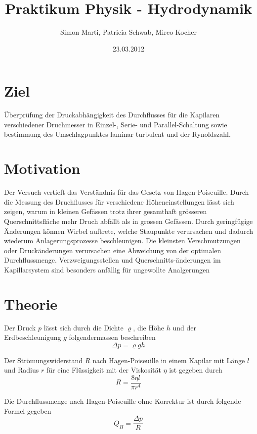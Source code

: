 \documentclass[12pt,a4paper]{article}
\title{Praktikum Physik - Hydrodynamik}
\author{Simon Marti, Patricia Schwab, Mirco Kocher}
\date{23.03.2012}
\begin{document}
\maketitle


\section*{Ziel}
\"Uberpr\"ufung der Druckabh\"angigkeit des Durchflusses f\"ur die Kapilaren verschiedener Druchmesser in Einzel-, Serie- und Parallel-Schaltung sowie bestimmung des Umschlagpunktes laminar-turbulent und der Rynoldszahl.

\section*{Motivation}
Der Versuch vertieft das Verst\"andnis f\"ur das Gesetz von Hagen-Poiseuille. Durch die Messung des Druchflusses f\"ur verschiedene H\"oheneinstellungen l\"asst sich zeigen, warum in kleinen Gef\"assen trotz ihrer gesamthaft gr\"osseren Querschnittsfl\"ache mehr Druch abf\"allt als in grossen Gef\"assen. Durch geringf\"ugige \"Anderungen k\"onnen Wirbel auftrete, welche Staupunkte verursachen und dadurch wiederum Anlagerungsprozesse beschleunigen. Die kleinsten Verschmutzungen oder Druck\"anderungen verursachen eine Abweichung von der optimalen Durchflussmenge. Verzweigungsstellen und Querschnitts-\"anderungen im Kapillarsystem sind besonders anf\"allig f\"ur ungewollte Analgerungen

\section*{Theorie}
Der Druck $p$ l\"asst sich durch die Dichte $\varrho$, die H\"ohe $h$ und der Erdbeschleunigung $g$ folgendermassen beschreiben
\begin{equation}
\Delta p = \varrho g h
\end{equation}

Der Str\"omungswiderstand $R$ nach Hagen-Poiseuille in einem Kapilar mit L\"ange $l$ und Radius $r$ f\"ur eine Fl\"ussigkeit mit der Viskosit\"at $\eta$ ist gegeben durch
\begin{equation}
R = \frac{8\eta l}{\pi r^4}
\end{equation}

Die Durchflussmenge nach Hagen-Poiseuille ohne Korrektur ist durch folgende Formel gegeben
\begin{equation}
Q_H = \frac{\Delta p}{R}
\end{equation}
\end{document}

